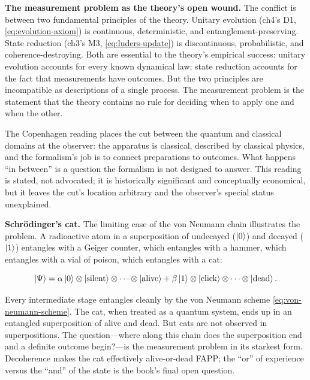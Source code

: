 \medskip\noindent\textbf{The measurement problem as the theory's open wound.}
The conflict is between two fundamental principles of the theory. Unitary evolution (ch4's D1, \eqref{eq:evolution-axiom}) is continuous, deterministic, and entanglement-preserving. State reduction (ch3's M3, \eqref{eq:luders-update}) is discontinuous, probabilistic, and coherence-destroying. Both are essential to the theory's empirical success: unitary evolution accounts for every known dynamical law; state reduction accounts for the fact that measurements have outcomes. But the two principles are incompatible as descriptions of a single process. The measurement problem is the statement that the theory contains no rule for deciding when to apply one and when the other.

The Copenhagen reading places the cut between the quantum and classical domains at the observer: the apparatus is classical, described by classical physics, and the formalism's job is to connect preparations to outcomes. What happens ``in between'' is a question the formalism is not designed to answer. This reading is stated, not advocated; it is historically significant and conceptually economical, but it leaves the cut's location arbitrary and the observer's special status unexplained.

\medskip\noindent\textbf{Schr\"odinger's cat.}
The limiting case of the von Neumann chain illustrates the problem. A radioactive atom in a superposition of undecayed ($\ket{0}$) and decayed ($\ket{1}$) entangles with a Geiger counter, which entangles with a hammer, which entangles with a vial of poison, which entangles with a cat:
\begin{linenomath}
\begin{equation}
\ket{\Psi} = \alpha\ket{0}\otimes\ket{\text{silent}}\otimes\cdots\otimes\ket{\text{alive}}
+ \beta\ket{1}\otimes\ket{\text{click}}\otimes\cdots\otimes\ket{\text{dead}}.
\end{equation}
\end{linenomath}
Every intermediate stage entangles cleanly by the von Neumann scheme \eqref{eq:von-neumann-scheme}. The cat, when treated as a quantum system, ends up in an entangled superposition of alive and dead. But cats are not observed in superpositions. The question---where along this chain does the superposition end and a definite outcome begin?---is the measurement problem in its starkest form. Decoherence makes the cat effectively alive-or-dead FAPP; the ``or'' of experience versus the ``and'' of the state is the book's final open question.

